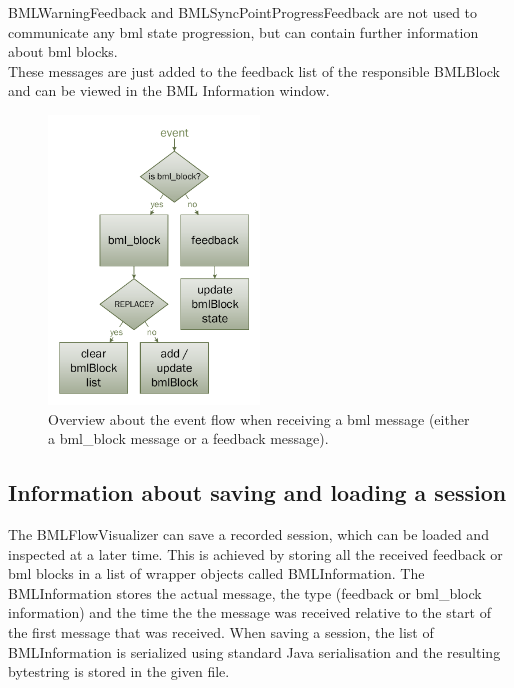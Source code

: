 \documentclass[12pt,a4paper]{article}
\begin{document}
BMLWarningFeedback and BMLSyncPointProgressFeedback are not used to communicate any bml state progression, but can contain further information about bml blocks. \\

These messages are just added to the feedback list of the responsible BMLBlock and can be viewed in the BML Information window.

\begin{figure}[!htb]
\centering
 \includegraphics[width=0.5\textwidth]{images/bmlEventFlow.pdf}
 \caption{Overview about the event flow when receiving a bml message (either a bml\_block message or a feedback message).}
 \label{fig:eventflow}
\end{figure}

\subsection{Information about saving and loading a session} \label{sec:saveload}

The BMLFlowVisualizer can save a recorded session, which can be loaded and inspected at a later time. This is achieved by storing all the received feedback or bml blocks in a list of wrapper objects called BMLInformation. The BMLInformation stores the actual message, the type (feedback or bml\_block information) and the time the the message was received relative to the start of the first message that was received. When saving a session, the list of BMLInformation is serialized using standard Java serialisation and the resulting bytestring is stored in the given file. 
\end{document}
